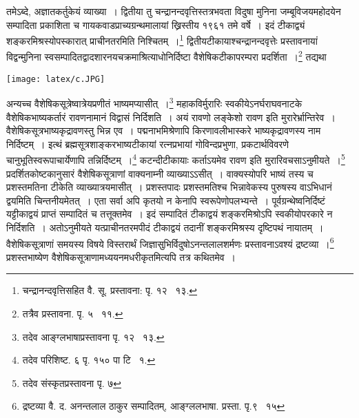\documentclass[11pt, openany]{book}
\begin{document}
\newpage
\noindent
तमेऽब्दे, अज्ञातकर्तुकेयं व्याख्या~। द्वितीया तु {\knu चन्द्रानन्दवृत्ति}स्तत्रभवता विदुषा {\knu मुनिना जम्बूविजयमहोदये}न सम्पादिता प्रकाशिता च {\knu गायकवाडप्राच्यग्रन्थमालायां} ख्रिस्तीय १९६१ तमे वर्षे~। इदं टीकाद्व्यं {\knu शङ्करमिश्रस्योपस्कारात्} प्राचीनतरमिति निश्चितम्~।\renewcommand{\thefootnote}{२६}\footnote{चन्द्रानन्दवृत्तिसहित वै. सू. प्रस्तावना: पृ. १२  \textendash\ १३.} द्वितीयटीकायाश्चन्द्रानन्दवृत्तेः प्रस्तावनायां विद्वन्मुनिना स्वसम्पादित{\knu द्वादशारनयचक्र}माश्रित्याधोनिर्दिष्टा वैशेषिकटीकापरम्परा प्रदर्शिता~।\renewcommand{\thefootnote}{२७}\footnote{तत्रैव प्रस्तावना. पृ. ५  \textendash\ ११.} तद्यथा

\begin{center}
\texttt{[image: latex/c.JPG]}
\end{center}

अन्यच्च वैशेषिकसूत्रेष्वात्रेयप्रणीतं भाष्यमप्यासीत्~।\renewcommand{\thefootnote}{२८}\footnote{तदेव आङ्ग्लभाषाप्रस्तावना पृ. १२  \textendash\ १३.} महाकविर्मुरारिः स्वकीयेऽनर्घराघवनाटके वैशेषिकभाष्यकर्तारं रावणनामानं विद्वासं निर्दिशति~। अयं रावणो लङ्केशो रावण इति मुरारेर्भ्रान्तिरेव~। वैशेषिकसूत्रभाष्यकृद्रावणस्तु भिन्न एव~। पद्मनाभमिश्रेणापि किरणावलीभास्करे भाष्यकृद्रावणस्य नाम निर्दिष्टम्~। इत्थं ब्रह्मसूत्रशाङ्करभाष्यटीकायां रत्नप्रभायां गोविन्दप्रभुणा, प्रकटार्थविवरणे चानुभूतिस्वरूपाचार्येणापि तन्निर्दिष्टम्~।\renewcommand{\thefootnote}{२९}\footnote{तदेव परिशिष्ट. ६ पृ. १५० पा टि  \textendash\ १.} कटन्दीटीकायाः कर्ताऽयमेव रावण इति मुरारिवचसाऽनुमीयते~।\renewcommand{\thefootnote}{३०}\footnote{तदेव संस्कृतप्रस्तावना पृ. ७} प्रदर्शितकोष्टकानुसारं वैशेषिकसूत्राणां वाक्यनाम्नी व्याख्याऽऽसीत्~। वाक्यस्योपरि भाष्यं तस्य च प्रशस्तमतिना टीकेति व्याख्यात्रयमासीत्~। प्रशस्तपादः प्रशस्तमतिश्च भिन्नावेकस्य पुरुषस्य वाऽभिधानं द्वयमिति चिन्तनीयमेतत्~। एता सर्वा अपि कृतयो न केनापि स्वरूपेणोपलभ्यन्ते~। पूर्वग्रन्थेष्वनिर्दिष्टं यट्टीकाद्वयं प्राप्तं सम्पादितं च तत्तूक्तमेव~। इदं सम्पादितं टीकाद्वयं शङ्करमिश्रोऽपि स्वकीयोपरकारे न निर्दिशति~। अतोऽनुमीयते यत्प्राचीनतरमपीदं टीकाद्वयं तदानीं शङ्करमिश्रस्य दृष्टिपथं नायातम्~। वैशेषिकसूत्राणां समयस्य विषये विस्तरार्थं जिज्ञासुभिर्विदुषोऽनन्तलालशर्मणः प्रस्तावनाऽवश्यं द्रष्टव्या~।\renewcommand{\thefootnote}{३१}\footnote{द्रष्टव्या वै. द. अनन्तलाल ठाकुर सम्पादितम्, आङ्ग्ललभाषा. प्रस्ता. पृ.९  \textendash\ १५} प्रशस्तभाष्येण वैशेषिकसूत्राणामध्ययनमधरीकृतमित्यपि तत्र कथितमेव~।
\end{document}
